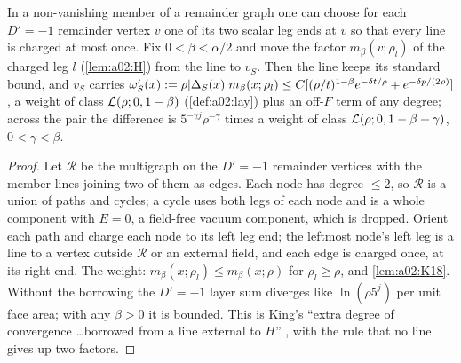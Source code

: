 \begin{lemma}\label{lem:a02:CH}
In a non-vanishing member of a remainder graph one can choose for each $D'=-1$ remainder vertex $v$ one of its two scalar leg ends at $v$ so that every line is charged at most once. Fix $0<\beta<\alpha/2$ and move the factor $m_\beta(v;\rho_l)$ of the charged leg $l$ (\cref{lem:a02:H}) from the line to $v_S$. Then the line keeps its standard bound, and $v_S$ carries $\omega'_S(x):=\rho|\Delta_S(x)|m_\beta(x;\rho_l)\le C[(\rho/t)^{1-\beta}e^{-\delta t/\rho}+e^{-\delta p/(2\rho)}]$, a weight of class $\mathcal L(\rho;0,1-\beta)$ (\cref{def:a02:lay}) plus an off-$F$ term of any degree; across the pair the difference is $5^{-\gamma j}\rho^{-\gamma}$ times a weight of class $\mathcal L(\rho;0,1-\beta+\gamma)$, $0<\gamma<\beta$.
\end{lemma}
\begin{proof}
Let $\mathcal R$ be the multigraph on the $D'=-1$ remainder vertices with the member lines joining two of them as edges. Each node has degree $\le2$, so $\mathcal R$ is a union of paths and cycles; a cycle uses both legs of each node and is a whole component with $E=0$, a field-free vacuum component, which is dropped. Orient each path and charge each node to its left leg end; the leftmost node's left leg is a line to a vertex outside $\mathcal R$ or an external field, and each edge is charged once, at its right end. The weight: $m_\beta(x;\rho_l)\le m_\beta(x;\rho)$ for $\rho_l\ge\rho$, and \cref{lem:a02:K18}. Without the borrowing the $D'=-1$ layer sum diverges like $\ln(\rho5^{j})$ per unit face area; with any $\beta>0$ it is bounded. This is King's ``extra degree of convergence \ldots borrowed from a line external to $H$'' \cite[p.~332]{K2}, with the rule that no line gives up two factors.
\end{proof}

